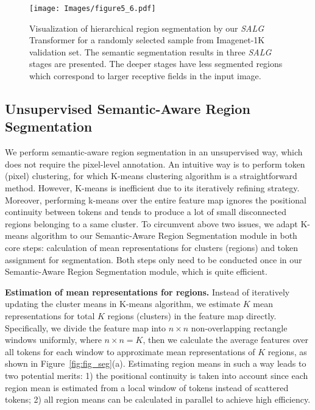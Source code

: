\begin{figure*}[!t]
\centering
\texttt{[image: Images/figure5\_6.pdf]}
\caption{Visualization of hierarchical region segmentation by our \emph{SALG} Transformer for a randomly selected sample from Imagenet-1K validation set. The semantic segmentation results in three \emph{SALG} stages are presented. The deeper stages have less segmented regions which correspond to larger receptive fields in the input image.}
\label{fig:hie_segm}
\end{figure*}

\subsection{Unsupervised Semantic-Aware Region Segmentation}
\label{sec:3.2}
We perform semantic-aware region segmentation in an unsupervised way, which does not require the pixel-level annotation. An intuitive way is to perform token (pixel) clustering, for which K-means clustering algorithm is a straightforward method. However, K-means is inefficient due to its iteratively refining strategy. Moreover, performing k-means over the entire feature map ignores the positional continuity between tokens and tends to produce a lot of small disconnected regions belonging to a same cluster. To circumvent above two issues, we adapt K-means algorithm to our Semantic-Aware Region Segmentation module in both core steps: calculation of mean representations for clusters (regions) and token assignment for segmentation. Both steps only need to be conducted once in our Semantic-Aware Region Segmentation module, which is quite efficient.

\smallskip\noindent\textbf{Estimation of mean representations for regions.}
Instead of iteratively updating the cluster means in K-means algorithm, we estimate $K$ mean representations for total $K$ regions (clusters) in the feature map directly. Specifically, we divide the feature map into $n \times n$ non-overlapping rectangle windows uniformly, where $n \times n = K$, then we calculate the average features over all tokens for each window to approximate mean representations of $K$ regions, as shown in Figure~\ref{fig:fig_seg}(a). Estimating region means in such a way leads to two potential merits: 1) the positional continuity is taken into account since each region mean is estimated from a local window of tokens instead of scattered tokens; 2) all region means can be calculated in parallel to achieve high efficiency. 

